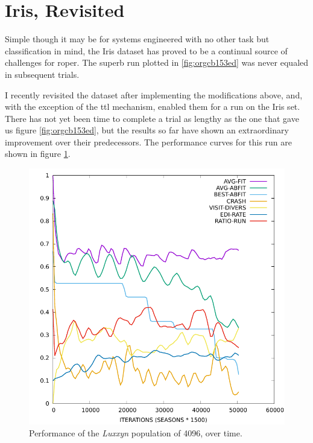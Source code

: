 \documentclass[12pt,glossary]{dalthesis}
\begin{document}
\section{Iris, Revisited}
\label{sec:orgf19c232}
Simple though it may be for systems engineered with no other task but classification in mind, the Iris dataset has 
proved to be a continual source of challenges for \gls{roper}. The superb run plotted in
\ref{fig:orgcb153ed} was never equaled in subsequent trials. 

I recently revisited the dataset after implementing the modifications above, and, with
the exception of the \gls{ttl} mechanism, enabled them for a run on the Iris set. There
has not yet been time to complete a trial as lengthy as the one that gave us figure
\ref{fig:orgcb153ed}, but the results so far have shown an extraordinary improvement over
their predecessors. The performance curves for this run are shown in figure \ref{fig:org40a18f3}. 



\begin{figure}[htbp]
\centering
\includegraphics[width=.9\linewidth]{../images/plots/luxxyn.pdf}
\caption{\label{fig:org40a18f3}
Performance of the \emph{Luxxyn} population of 4096, over time.}
\end{figure}
\end{document}

